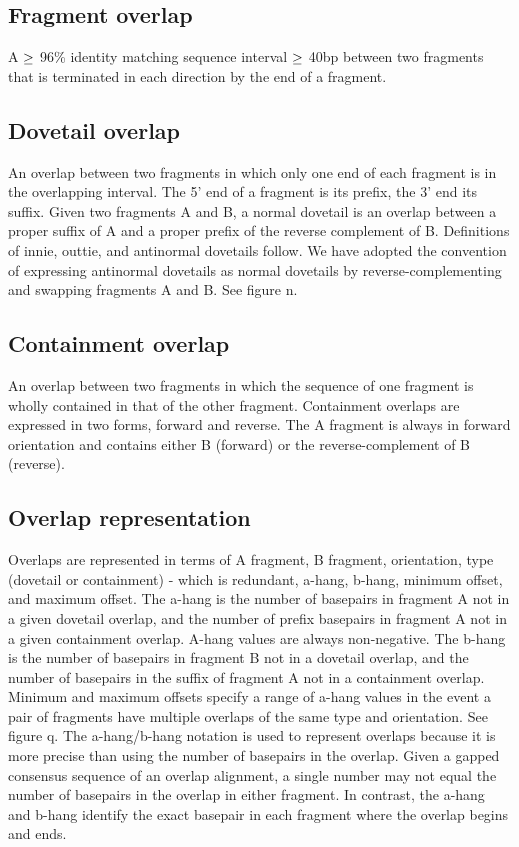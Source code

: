 \documentclass{article}
\begin{document}
\subsection{Fragment overlap}
  A $\mathnormal{\ge}$ 96\% identity matching sequence interval
$\mathnormal{\ge}$ 40bp between two fragments that is terminated in
each direction by the end of a fragment.

\subsection{Dovetail overlap}
  An overlap between two fragments in which only one end of each
fragment is in the overlapping interval. The 5' end of a fragment is
its prefix, the 3' end its suffix. Given two fragments A and B, a
normal dovetail is an overlap between a proper suffix of A and a
proper prefix of the reverse complement of B. Definitions of innie,
outtie, and antinormal dovetails follow. We have adopted the
convention of expressing antinormal dovetails as normal dovetails by
reverse-complementing and swapping fragments A and B. See figure n.

\subsection{Containment overlap}
  An overlap between two fragments in which the sequence of one
fragment is wholly contained in that of the other
fragment. Containment overlaps are expressed in two forms, forward and
reverse. The A fragment is always in forward orientation and contains
either B (forward) or the reverse-complement of B (reverse).

\subsection{Overlap representation}
  Overlaps are represented in terms of A fragment, B fragment,
orientation, type (dovetail or containment) - which is redundant,
a-hang, b-hang, minimum offset, and maximum offset. The a-hang is the
number of basepairs in fragment A not in a given dovetail overlap, and
the number of prefix basepairs in fragment A not in a given
containment overlap. A-hang values are always non-negative. The b-hang
is the number of basepairs in fragment B not in a dovetail overlap,
and the number of basepairs in the suffix of fragment A not in a
containment overlap. Minimum and maximum offsets specify a range of
a-hang values in the event a pair of fragments have multiple overlaps
of the same type and orientation. See figure q. The a-hang/b-hang
notation is used to represent overlaps because it is more precise than
using the number of basepairs in the overlap. Given a gapped consensus
sequence of an overlap alignment, a single number may not equal the
number of basepairs in the overlap in either fragment. In contrast,
the a-hang and b-hang identify the exact basepair in each fragment
where the overlap begins and ends.
\end{document}
